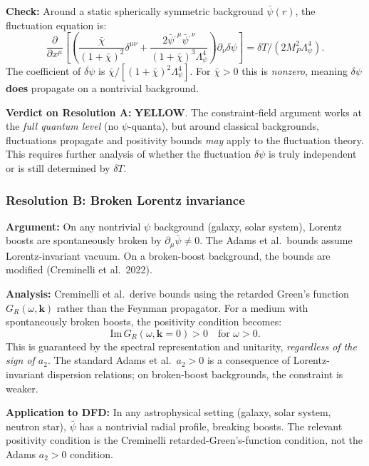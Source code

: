 \documentclass[11pt,a4paper]{article}
\newcommand{\YELLOW}{\textcolor{dfdyellow}{\textbf{YELLOW}}}
\begin{document}
\textbf{Check:} Around a static spherically symmetric background $\bar{\psi}(r)$, the fluctuation equation is:
\begin{equation}
\frac{\partial}{\partial x^\mu}\left[\left(\frac{\bar{\chi}}{(1+\bar{\chi})^2}\delta^{\mu\nu} + \frac{2\bar{\psi}^{,\mu}\bar{\psi}^{,\nu}}{(1+\bar{\chi})^3\Lambda_\psi^4}\right)\partial_\nu\delta\psi\right] = \delta T/(2M_P^2\Lambda_\psi^4).
\end{equation}
The coefficient of $\ddot{\delta\psi}$ is $\bar{\chi}/[(1+\bar{\chi})^2\Lambda_\psi^4]$. For $\bar{\chi} > 0$ this is \emph{nonzero}, meaning $\delta\psi$ \textbf{does} propagate on a nontrivial background.

\textbf{Verdict on Resolution A:} \YELLOW. The constraint-field argument works at the \emph{full quantum level} (no $\psi$-quanta), but around classical backgrounds, fluctuations propagate and positivity bounds \emph{may} apply to the fluctuation theory. This requires further analysis of whether the fluctuation $\delta\psi$ is truly independent or is still determined by $\delta T$.

\subsubsection{Resolution B: Broken Lorentz invariance}

\textbf{Argument:} On any nontrivial $\psi$ background (galaxy, solar system), Lorentz boosts are spontaneously broken by $\partial_\mu\bar{\psi} \neq 0$. The Adams et al.\ bounds assume Lorentz-invariant vacuum. On a broken-boost background, the bounds are modified (Creminelli et al.\ 2022).

\textbf{Analysis:} Creminelli et al.\ derive bounds using the retarded Green's function $G_R(\omega, \mathbf{k})$ rather than the Feynman propagator. For a medium with spontaneously broken boosts, the positivity condition becomes:
\begin{equation}
\text{Im}\,G_R(\omega, \mathbf{k}=0) > 0 \quad \text{for } \omega > 0.
\end{equation}
This is guaranteed by the spectral representation and unitarity, \emph{regardless of the sign of $a_2$}. The standard Adams et al.\ $a_2 > 0$ is a consequence of Lorentz-invariant dispersion relations; on broken-boost backgrounds, the constraint is weaker.

\textbf{Application to DFD:} In any astrophysical setting (galaxy, solar system, neutron star), $\bar{\psi}$ has a nontrivial radial profile, breaking boosts. The relevant positivity condition is the Creminelli retarded-Green's-function condition, not the Adams $a_2 > 0$ condition.
\end{document}
